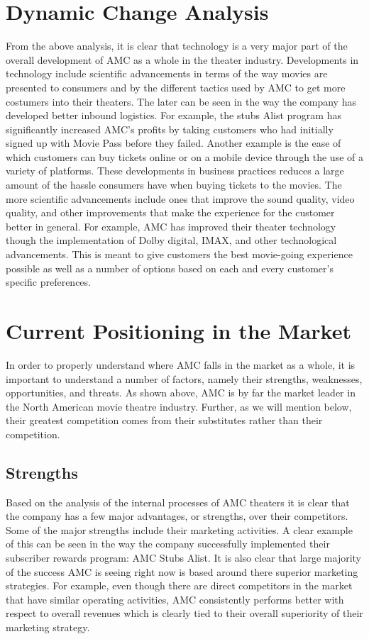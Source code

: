 \documentclass[12pt]{article}
\begin{document}
\section{Dynamic Change Analysis}

From the above analysis, it is clear that technology is a very major part of the overall development of AMC as a whole in the theater industry. Developments in technology include scientific advancements in terms of the way movies are presented to consumers and by the different tactics used by AMC to get more costumers into their theaters. The later can be seen in the way the company has developed better inbound logistics. For example, the stubs Alist program has significantly increased AMC's profits by taking customers who had initially signed up with Movie Pass before they failed. Another example is the ease of which customers can buy tickets online or on a mobile device through the use of a variety of platforms. These developments in business practices reduces a large amount of the hassle consumers have when buying tickets to the movies. The more scientific advancements include ones that improve the sound quality, video quality, and other improvements that make the experience for the customer better in general. For example, AMC has improved their theater technology though the implementation of Dolby digital, IMAX, and other technological advancements. This is meant to give customers the best movie-going experience possible as well as a number of options based on each and every customer's specific preferences.






\section{Current Positioning in the Market}
In order to properly understand where AMC falls in the market as a whole, it is important to understand a number of factors, namely their strengths, weaknesses, opportunities, and threats. As shown above, AMC is by far the market leader in the North American movie theatre industry. Further, as we will mention below, their greatest competition comes from their substitutes rather than their competition. 

\subsection{Strengths} 
Based on the analysis of the internal processes of AMC theaters it is clear that the company has a few major advantages, or strengths, over their competitors. Some of the major strengths include their marketing activities. A clear example of this can be seen in the way the company successfully implemented their subscriber rewards program: AMC Stubs Alist. It is also clear that large majority of the success AMC is seeing right now is based around there superior marketing strategies. For example, even though there are direct competitors in the market that have similar operating activities, AMC consistently performs better with respect to overall revenues which is clearly tied to their overall superiority of their marketing strategy.
\end{document}
